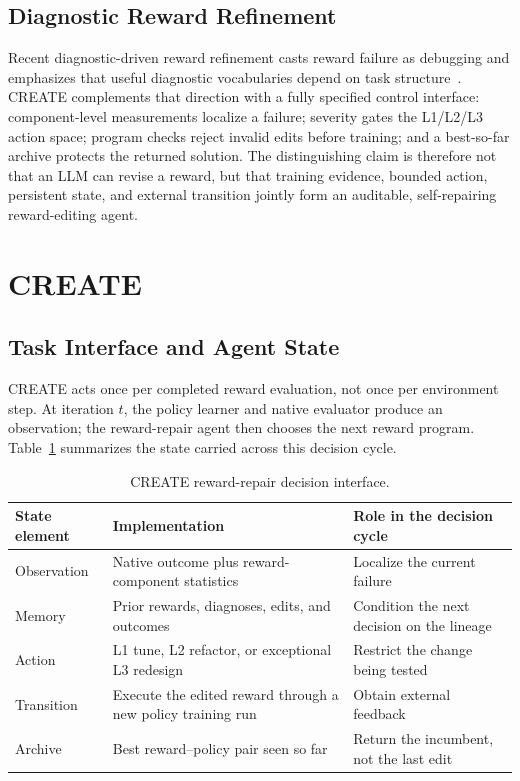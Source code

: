 \documentclass[conference]{IEEEtran}
\begin{document}
\subsection{Diagnostic Reward Refinement}
Recent diagnostic-driven reward refinement casts reward failure as debugging
and emphasizes that useful diagnostic vocabularies depend on task
structure~\cite{wang2026diagnostic}. CREATE complements that direction with a
fully specified control interface: component-level measurements localize a
failure; severity gates the L1/L2/L3 action space; program checks reject
invalid edits before training; and a best-so-far archive protects the returned
solution. The distinguishing claim is therefore not that an LLM can revise a
reward, but that training evidence, bounded action, persistent state, and
external transition jointly form an auditable, self-repairing reward-editing
agent.

\section{CREATE}
\subsection{Task Interface and Agent State}
CREATE acts once per completed reward evaluation, not once per environment
step. At iteration $t$, the policy learner and native evaluator produce an
observation; the reward-repair agent then chooses the next reward program.
Table~\ref{tab:agent} summarizes the state carried across this decision cycle.

\begin{table}[t]
\caption{CREATE reward-repair decision interface.}
\label{tab:agent}
\centering
\scriptsize
\setlength{\tabcolsep}{3.1pt}
\begin{tabular}{p{}p{}p{}}
\toprule
State element & Implementation & Role in the decision cycle \\
\midrule
Observation & Native outcome plus reward-component statistics & Localize the
current failure \\
Memory & Prior rewards, diagnoses, edits, and outcomes & Condition the next
decision on the lineage \\
Action & L1 tune, L2 refactor, or exceptional L3 redesign & Restrict the change
being tested \\
Transition & Execute the edited reward through a new policy training run &
Obtain external feedback \\
Archive & Best reward--policy pair seen so far & Return the incumbent, not the
last edit \\
\bottomrule
\end{tabular}
\end{table}
\end{document}

